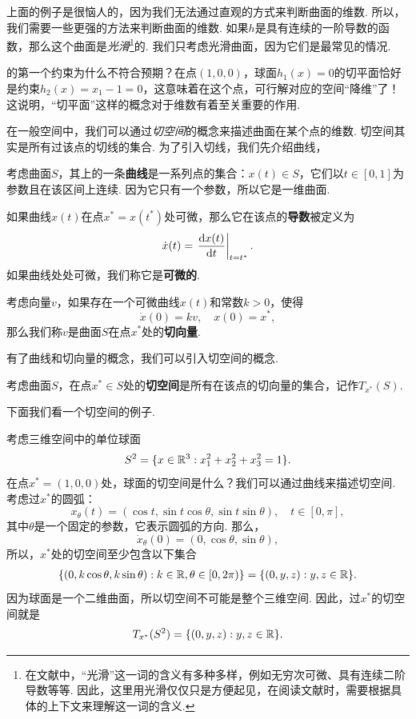 上面的例子是很恼人的，因为我们无法通过直观的方式来判断曲面的维数. 所以，我们需要一些更强的方法来判断曲面的维数. 如果$h$是具有连续的一阶导数的函数，那么这个曲面是\textit{光滑}\footnote{在文献中，“光滑”这一词的含义有多种多样，例如无穷次可微、具有连续二阶导数等等. 因此，这里用光滑仅仅只是方便起见，在阅读文献时，需要根据具体的上下文来理解这一词的含义.}的. 我们只考虑光滑曲面，因为它们是最常见的情况.

 的第一个约束为什么不符合预期？在点$(1,0,0)$，球面$h_1(x)=0$的切平面恰好是约束$h_2(x)=x_1 - 1 = 0$，这意味着在这个点，可行解对应的空间“降维”了！这说明，“切平面”这样的概念对于维数有着至关重要的作用. 
    
在一般空间中，我们可以通过\textit{切空间}的概念来描述曲面在某个点的维数. 切空间其实是所有过该点的切线的集合. 为了引入切线，我们先介绍曲线，
\begin{definition}[曲线和切向量]
    考虑曲面$S$，其上的一条\textbf{曲线}是一系列点的集合：$x(t)\in S$，它们以$t\in[0,1]$为参数且在该区间上连续. 因为它只有一个参数，所以它是一维曲面. 

    如果曲线$x(t)$在点$x^*=x(t^*)$处可微，那么它在该点的\textbf{导数}被定义为
    \[\dot{x}(t)=\left.\frac{\mathrm{d} x(t)}{\mathrm{d} t}\right|_{t=t^*}.\]
    如果曲线处处可微，我们称它是\textbf{可微的}. 

    考虑向量$v$，如果存在一个可微曲线$x(t)$和常数$k>0$，使得
    \[\dot{x}(0)=kv,\quad x(0)=x^*,\]
    那么我们称$v$是曲面$S$在点$x^*$处的\textbf{切向量}.
\end{definition}

有了曲线和切向量的概念，我们可以引入切空间的概念. 

\begin{definition}[切空间]
    考虑曲面$S$，在点$x^*\in S$处的\textbf{切空间}是所有在该点的切向量的集合，记作$T_{x^*}(S)$.
\end{definition}

下面我们看一个切空间的例子.

\begin{example}[三维球面的切空间]\label{example:tan-space}
    考虑三维空间中的单位球面
    \[S^2=\{x\in\mathbb{R}^3:x_1^2+x_2^2+x_3^2=1\}.\]
    在点$x^*=(1,0,0)$处，球面的切空间是什么？我们可以通过曲线来描述切空间. 考虑过$x^*$的圆弧：
    \[x_\theta(t)=(\cos t,\sin t\cos\theta,\sin t\sin\theta), \quad t\in[0,\pi],\]
    其中$\theta$是一个固定的参数，它表示圆弧的方向. 那么，
    \[\dot{x}_\theta(0)=(0,\cos\theta,\sin\theta),\]
    所以，$x^*$处的切空间至少包含以下集合
    \begin{align*}
        \{(0,k\cos \theta,k\sin\theta):k\in\mathbb{R},\theta\in[0,2\pi)\}= \{(0,y,z):y,z\in\mathbb{R}\}.
    \end{align*}
    因为球面是一个二维曲面，所以切空间不可能是整个三维空间. 因此，过$x^*$的切空间就是
    \[T_{x^*}(S^2)=\{(0,y,z):y,z\in\mathbb{R}\}.\]
\end{example}

